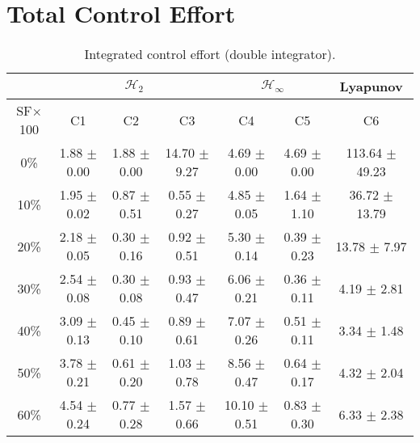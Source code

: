 \section{Total Control Effort}
\begin{table}[H]
\centering
\scriptsize
\begin{tabular}{| c || c | c | c | c | c | c |}
	\hline
	 & \multicolumn{3}{c|}{$\mathcal{H}_{2}$} & \multicolumn{2}{c|}{$\mathcal{H}_{\infty}$} & Lyapunov\\
	\hline
	SF$\times$100 & C1& C2 & C3 & C4 & C5 & C6\\
	\hline\hline
	0\% & 1.88 $\pm$ 0.00 & 1.88 $\pm$ 0.00 & 14.70 $\pm$ 9.27 & 4.69 $\pm$ 0.00 & 4.69 $\pm$ 0.00 & 113.64 $\pm$ 49.23\\
	\hline
	10\% & 1.95 $\pm$ 0.02 & 0.87 $\pm$ 0.51 & 0.55 $\pm$ 0.27 & 4.85 $\pm$ 0.05 & 1.64 $\pm$ 1.10 & 36.72 $\pm$ 13.79\\
	\hline
	20\% & 2.18 $\pm$ 0.05 & 0.30 $\pm$ 0.16 & 0.92 $\pm$ 0.51 & 5.30 $\pm$ 0.14 & 0.39 $\pm$ 0.23 & 13.78 $\pm$ 7.97\\
	\hline
	30\% & 2.54 $\pm$ 0.08 & 0.30 $\pm$ 0.08 & 0.93 $\pm$ 0.47 & 6.06 $\pm$ 0.21 & 0.36 $\pm$ 0.11 & 4.19 $\pm$ 2.81\\
	\hline
	40\% & 3.09 $\pm$ 0.13 & 0.45 $\pm$ 0.10 & 0.89 $\pm$ 0.61 & 7.07 $\pm$ 0.26 & 0.51 $\pm$ 0.11 & 3.34 $\pm$ 1.48\\
	\hline
	50\% & 3.78 $\pm$ 0.21 & 0.61 $\pm$ 0.20 & 1.03 $\pm$ 0.78 & 8.56 $\pm$ 0.47 & 0.64 $\pm$ 0.17 & 4.32 $\pm$ 2.04\\
	\hline
	60\% & 4.54 $\pm$ 0.24 & 0.77 $\pm$ 0.28 & 1.57 $\pm$ 0.66 & 10.10 $\pm$ 0.51 & 0.83 $\pm$ 0.30 & 6.33 $\pm$ 2.38\\
	\hline
\end{tabular}
\caption{Integrated control effort (double integrator).}
\label{table:control_effort_double_integrator:noise}
\end{table}

